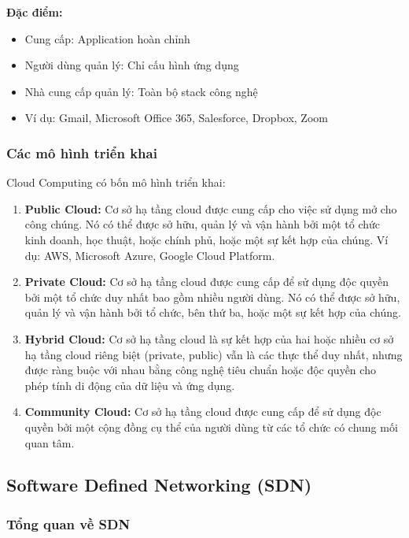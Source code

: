 \textbf{Đặc điểm:}
\begin{itemize}
    \item Cung cấp: Application hoàn chỉnh
    \item Người dùng quản lý: Chỉ cấu hình ứng dụng
    \item Nhà cung cấp quản lý: Toàn bộ stack công nghệ
    \item Ví dụ: Gmail, Microsoft Office 365, Salesforce, Dropbox, Zoom
\end{itemize}

\subsubsection{Các mô hình triển khai}
Cloud Computing có bốn mô hình triển khai:

\begin{enumerate}
    \item \textbf{Public Cloud:} Cơ sở hạ tầng cloud được cung cấp cho việc sử dụng mở cho công chúng. Nó có thể được sở hữu, quản lý và vận hành bởi một tổ chức kinh doanh, học thuật, hoặc chính phủ, hoặc một sự kết hợp của chúng. Ví dụ: AWS, Microsoft Azure, Google Cloud Platform.
    
    \item \textbf{Private Cloud:} Cơ sở hạ tầng cloud được cung cấp để sử dụng độc quyền bởi một tổ chức duy nhất bao gồm nhiều người dùng. Nó có thể được sở hữu, quản lý và vận hành bởi tổ chức, bên thứ ba, hoặc một sự kết hợp của chúng.
    
    \item \textbf{Hybrid Cloud:} Cơ sở hạ tầng cloud là sự kết hợp của hai hoặc nhiều cơ sở hạ tầng cloud riêng biệt (private, public) vẫn là các thực thể duy nhất, nhưng được ràng buộc với nhau bằng công nghệ tiêu chuẩn hoặc độc quyền cho phép tính di động của dữ liệu và ứng dụng.
    
    \item \textbf{Community Cloud:} Cơ sở hạ tầng cloud được cung cấp để sử dụng độc quyền bởi một cộng đồng cụ thể của người dùng từ các tổ chức có chung mối quan tâm.
\end{enumerate}

\subsection{Software Defined Networking (SDN)}
\subsubsection{Tổng quan về SDN}


